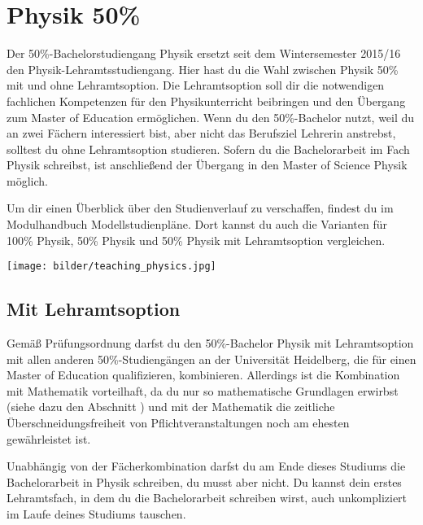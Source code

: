 \section{Physik 50\%}

Der 50\%-Bachelorstudiengang Physik ersetzt seit dem Wintersemester 2015/16 den Physik-Lehramtsstudiengang. Hier hast du die Wahl zwischen Physik 50\% mit und ohne Lehramtsoption. 
Die Lehramtsoption soll dir die notwendigen fachlichen Kompetenzen für den Physikunterricht beibringen und den Übergang zum Master of Education ermöglichen.
Wenn du den 50\%-Bachelor nutzt, weil du an zwei Fächern interessiert bist, aber nicht das Berufsziel Lehrerin anstrebst, solltest du ohne Lehramtsoption studieren. Sofern du die Bachelorarbeit im Fach Physik schreibst, ist anschließend der Übergang in den Master of Science Physik möglich.

Um dir einen Überblick über den Studienverlauf zu verschaffen, findest du im Modulhandbuch Modellstudienpläne. Dort kannst du auch die Varianten für 100\% Physik, 50\% Physik und 50\% Physik mit Lehramtsoption vergleichen.

\begin{figure*}[b]
    \centering
    \texttt{[image: bilder/teaching\_physics.jpg]}
\end{figure*}

\subsection{Mit Lehramtsoption}

Gemäß Prüfungsordnung darfst du den 50\%-Bachelor Physik mit Lehramtsoption mit allen anderen 50\%-Studiengängen an der Universität Heidelberg, die für einen Master of Education qualifizieren, kombinieren. Allerdings ist die Kombination mit Mathematik vorteilhaft, da du nur so mathematische Grundlagen erwirbst (siehe dazu den Abschnitt ) und mit der Mathematik die zeitliche Überschneidungsfreiheit von Pflichtveranstaltungen noch am ehesten gewährleistet ist.

Unabhängig von der Fächerkombination darfst du am Ende dieses Studiums die Bachelorarbeit in Physik schreiben, du musst aber nicht. Du kannst dein erstes Lehramtsfach, in dem du die Bachelorarbeit schreiben wirst, auch unkompliziert im Laufe deines Studiums tauschen.

